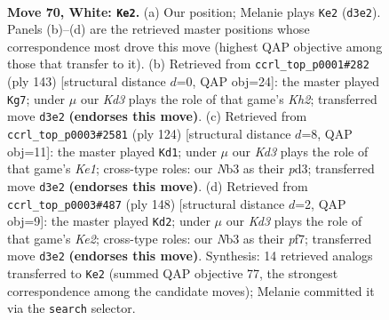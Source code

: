 \documentclass[11pt]{article}
\begin{document}
\clearpage

\begin{figure}[p]\centering
\begin{subfigure}{0.46\textwidth}\centering
\resizebox{\linewidth}{!}{%
\newchessgame
\chessboard[
  setfen={5k2/2P5/2r5/4B3/8/1N1K4/8/8 w - - 53 70},
  showmover=false,
  pgfstyle=straightmove, color=movearrow, markmove={d3-e2}
]}
\caption{}
\end{subfigure}\hfill
\begin{subfigure}{0.46\textwidth}\centering
\resizebox{\linewidth}{!}{%
\newchessgame
\chessboard[
  setfen={8/7k/3n4/3b4/1R6/1p6/5K2/8 b - - 17 72},
  showmover=false,
  pgfstyle=straightmove, color=movearrow, markmove={h7-g7}
]}
\caption{}
\end{subfigure}
\\[4pt]
\begin{subfigure}{0.46\textwidth}\centering
\resizebox{\linewidth}{!}{%
\newchessgame
\chessboard[
  setfen={8/4B3/8/8/4k2P/3p4/7r/4K3 w - - 17 63},
  showmover=false,
  pgfstyle=straightmove, color=movearrow, markmove={e1-d1}
]}
\caption{}
\end{subfigure}\hfill
\begin{subfigure}{0.46\textwidth}\centering
\resizebox{\linewidth}{!}{%
\newchessgame
\chessboard[
  setfen={8/1P3p2/2B5/4k3/8/1r6/4K3/8 w - - 23 75},
  showmover=false,
  pgfstyle=straightmove, color=movearrow, markmove={e2-d2}
]}
\caption{}
\end{subfigure}
\caption{\textbf{Move 70, White: \texttt{Ke2}.} (a) Our position; Melanie plays \texttt{Ke2} (\texttt{d3e2}). Panels (b)--(d) are the retrieved master positions whose correspondence most drove this move (highest QAP objective among those that transfer to it). (b) Retrieved from \texttt{ccrl\_top\_p0001\#282} (ply 143) [structural distance $d$=0, QAP obj=24]: the master played \texttt{Kg7}; under $\mu$ our \emph{Kd3} plays the role of that game's \emph{Kh2}; transferred move \texttt{d3e2} \textbf{(endorses this move)}. (c) Retrieved from \texttt{ccrl\_top\_p0003\#2581} (ply 124) [structural distance $d$=8, QAP obj=11]: the master played \texttt{Kd1}; under $\mu$ our \emph{Kd3} plays the role of that game's \emph{Ke1}; cross-type roles: our \emph{N}b3 as their \emph{p}d3; transferred move \texttt{d3e2} \textbf{(endorses this move)}. (d) Retrieved from \texttt{ccrl\_top\_p0003\#487} (ply 148) [structural distance $d$=2, QAP obj=9]: the master played \texttt{Kd2}; under $\mu$ our \emph{Kd3} plays the role of that game's \emph{Ke2}; cross-type roles: our \emph{N}b3 as their \emph{p}f7; transferred move \texttt{d3e2} \textbf{(endorses this move)}. Synthesis: 14 retrieved analogs transferred to \texttt{Ke2} (summed QAP objective 77, the strongest correspondence among the candidate moves); Melanie committed it via the \texttt{search} selector.}
\label{fig:thought-m138}
\end{figure}
\end{document}
